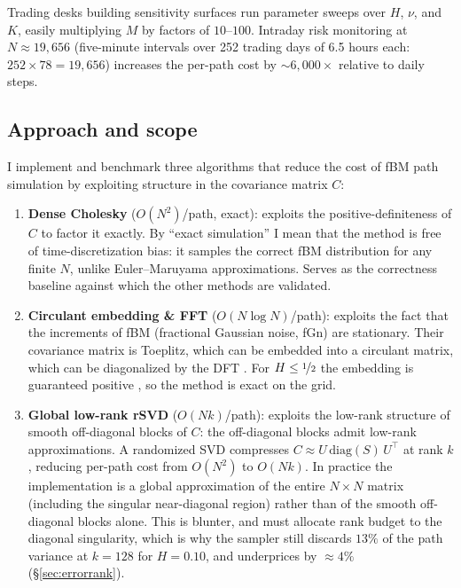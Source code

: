 Trading desks building sensitivity surfaces run parameter sweeps over $H$, $\nu$, and
$K$, easily multiplying $M$ by factors of $10$--$100$.  Intraday risk monitoring at
$N \approx 19{,}656$ (five-minute intervals over 252 trading days of 6.5 hours each:
$252 \times 78 = 19{,}656$) increases the per-path cost by $\sim 6{,}000\times$
relative to daily steps.

\subsection{Approach and scope}
\label{sec:scope}

I implement and benchmark three algorithms that reduce the cost of fBM path simulation
by exploiting structure in the covariance matrix $C$:

\begin{enumerate}
  \item \textbf{Dense Cholesky} ($O(N^2)$/path, exact): exploits the
        positive-definiteness of $C$ to factor it exactly.  By ``exact simulation''
        I mean that the method is free of time-discretization bias: it samples the correct
        fBM distribution for any finite $N$, unlike Euler--Maruyama approximations.
        Serves as the correctness baseline against which the other methods are validated.

  \item \textbf{Circulant embedding \& FFT} ($O(N\log N)$/path): exploits the
        fact that the increments of fBM (fractional Gaussian noise, fGn) are
        stationary. Their covariance matrix is Toeplitz, which can be embedded
        into a circulant matrix, which can be diagonalized by the DFT
        \citep{davies1987tests, wood1994simulation}.  For $H \leq \nicefrac{1}{2}$
        the embedding is guaranteed positive \citep{craigmile2003simulating}, so the
        method is exact on the grid.

  \item \textbf{Global low-rank rSVD} ($O(Nk)$/path): exploits the low-rank
        structure of smooth off-diagonal blocks of $C$: the off-diagonal blocks admit low-rank
        approximations.  A randomized SVD \citep{halko2011finding} compresses $C
        \approx U\,\mathrm{diag}(S)\,U^\top$ at rank $k$, reducing per-path cost from
        $O(N^2)$ to $O(Nk)$.  In practice the implementation is a global
        approximation of the entire $N\times N$ matrix (including the singular
        near-diagonal region) rather than of the smooth off-diagonal blocks alone.
        This is blunter, and must allocate rank budget to the diagonal singularity,
        which is why the sampler still discards $13\%$ of the path variance at
        $k = 128$ for $H = 0.10$, and underprices by $\approx 4\%$
        (§\ref{sec:errorrank}).
\end{enumerate}

